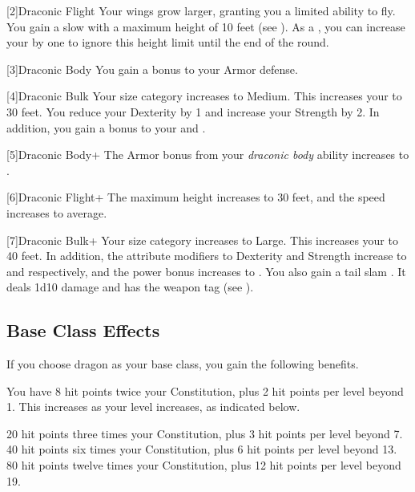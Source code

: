     [2]{Draconic Flight} Your wings grow larger, granting you a limited ability to fly.
      You gain a slow  with a maximum height of 10 feet (see ).
      As a , you can increase your  by one to ignore this height limit until the end of the round.

    [3]{Draconic Body} You gain a  bonus to your Armor defense.

    [4]{Draconic Bulk} Your size category increases to Medium.
      This increases your  to 30 feet.
      You reduce your Dexterity by 1 and increase your Strength by 2.
      In addition, you gain a  bonus to your  and .

    [5]{Draconic Body+} The Armor bonus from your \textit{draconic body} ability increases to .

    [6]{Draconic Flight+} The maximum height increases to 30 feet, and the speed increases to average.

    [7]{Draconic Bulk+} Your size category increases to Large.
      This increases your  to 40 feet.
      In addition, the attribute modifiers to Dexterity and Strength increase to  and  respectively, and the power bonus increases to .
      You also gain a tail slam .
      It deals 1d10 damage and has the  weapon tag (see ).

  \subsection{Base Class Effects}
    \highhpprogressiontable

    If you choose dragon as your base class, you gain the following benefits.

      You have 8 hit points \add twice your Constitution, plus 2 hit points per level beyond 1.
      This increases as your level increases, as indicated below.
      \begin{raggeditemize}
         20 hit points \add three times your Constitution, plus 3 hit points per level beyond 7.
         40 hit points \add six times your Constitution, plus 6 hit points per level beyond 13.
         80 hit points \add twelve times your Constitution, plus 12 hit points per level beyond 19.
      \end{raggeditemize}

